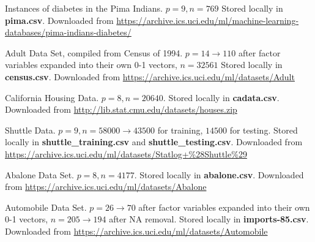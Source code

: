\documentclass[letter]{article}
\begin{document}
\begin{thebibliography}{99}
    
      Instances of diabetes in the Pima Indians. $p=9, n=769$ Stored locally in \textbf{pima.csv}. Downloaded from \url{https://archive.ics.uci.edu/ml/machine-learning-databases/pima-indians-diabetes/} 
  
     Adult Data Set, compiled from Census of 1994. $p=14 \rightarrow 110$ after factor variables expanded into their own 0-1 vectors, $n=32561$ Stored locally in \textbf{census.csv}. Downloaded from \url{https://archive.ics.uci.edu/ml/datasets/Adult} 
    
     California Housing Data.  $p = 8, n=20640$. Stored locally in \textbf{cadata.csv}. Downloaded from \url{http://lib.stat.cmu.edu/datasets/houses.zip}
	
	 Shuttle Data.  $p = 9, n = 58000 \rightarrow 43500$ for training, $14500$ for testing. Stored locally in \textbf{shuttle\_training.csv} and \textbf{shuttle\_testing.csv}. Downloaded from \url{https://archive.ics.uci.edu/ml/datasets/Statlog+\%28Shuttle\%29}
    
     Abalone Data Set. $p = 8, n = 4177$. Stored locally in \textbf{abalone.csv}. Downloaded from \url{https://archive.ics.uci.edu/ml/datasets/Abalone}
    
     Automobile Data Set. $p = 26 \rightarrow 70$ after factor variables expanded into their own 0-1 vectors, $n = 205 \rightarrow 194$ after NA removal. Stored locally in \textbf{imports-85.csv}. Downloaded from \url{https://archive.ics.uci.edu/ml/datasets/Automobile}
    
\end{thebibliography} 
 
\end{document}
